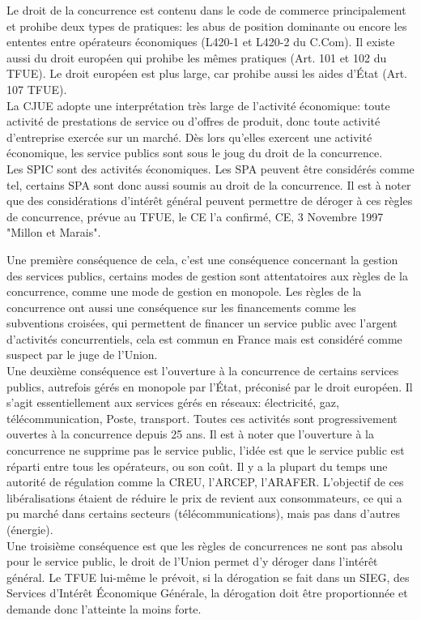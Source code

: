 \documentclass[10pt, a4paper, openany]{book}
\begin{document}
Le droit de la concurrence est contenu dans le code de commerce principalement et prohibe deux types de pratiques: les abus de position dominante ou encore les ententes entre opérateurs économiques (L420-1 et L420-2 du C.Com). Il existe aussi du droit européen qui prohibe les mêmes pratiques (Art. 101 et 102 du TFUE). Le droit européen est plus large, car prohibe aussi les aides d'État (Art. 107 TFUE). \\
La CJUE adopte une interprétation très large de l'activité économique: toute activité de prestations de service ou d'offres de produit, donc toute activité d'entreprise exercée sur un marché. Dès lors qu'elles exercent une activité économique, les service publics sont sous le joug du droit de la concurrence. \\
Les SPIC sont des activités économiques. Les SPA peuvent être considérés comme tel, certains SPA sont donc aussi soumis au droit de la concurrence. Il est à noter que des considérations d'intérêt général peuvent permettre de déroger à ces règles de concurrence, prévue au TFUE, le CE l'a confirmé, CE, 3 Novembre 1997 "Millon et Marais". 


Une première conséquence de cela, c'est une conséquence concernant la gestion des services publics, certains modes de gestion sont attentatoires aux règles de la concurrence, comme une mode de gestion en monopole. Les règles de la concurrence ont aussi une conséquence sur les financements comme les subventions croisées, qui permettent de financer un service public avec l'argent d'activités concurrentiels, cela est commun en France mais est considéré comme suspect par le juge de l'Union. \\
Une deuxième conséquence est l'ouverture à la concurrence de certains services publics, autrefois gérés en monopole par l'État, préconisé par le droit européen. Il s'agit essentiellement aux services gérés en réseaux: électricité, gaz, télécommunication, Poste, transport. Toutes ces activités sont progressivement ouvertes à la concurrence depuis 25 ans. Il est à noter que l'ouverture à la concurrence ne supprime pas le service public, l'idée est que le service public est réparti entre tous les opérateurs, ou son coût. Il y a la plupart du temps une autorité de régulation comme la CREU, l'ARCEP, l'ARAFER. L'objectif de ces libéralisations étaient de réduire le prix de revient aux consommateurs, ce qui a pu marché dans certains secteurs (télécommunications), mais pas dans d'autres (énergie). \\
Une troisième conséquence est que les règles de concurrences ne sont pas absolu pour le service public, le droit de l'Union permet d'y déroger dans l'intérêt général. Le TFUE lui-même le prévoit, si la dérogation se fait dans un SIEG, des Services d'Intérêt Économique Générale, la dérogation doit être proportionnée et demande donc l'atteinte la moins forte.
\end{document}
